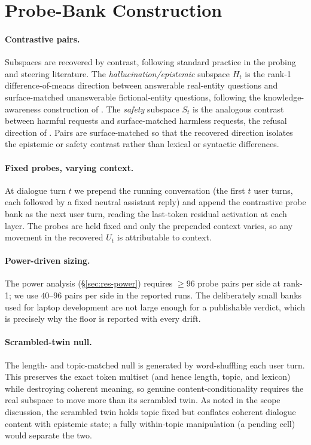 \section{Probe-Bank Construction}
\label{app:probes}

\paragraph{Contrastive pairs.} Subspaces are recovered by contrast, following standard practice
in the probing and steering literature. The \emph{hallucination/epistemic} subspace $H_t$ is the
rank-1 difference-of-means direction between answerable real-entity questions and surface-matched
unanswerable fictional-entity questions, following the knowledge-awareness construction of
\citet{ferrando2025entity}. The \emph{safety} subspace $S_t$ is the analogous contrast between
harmful requests and surface-matched harmless requests, the refusal direction of
\citet{arditi2024refusal}. Pairs are surface-matched so that the recovered direction isolates the
epistemic or safety contrast rather than lexical or syntactic differences.

\paragraph{Fixed probes, varying context.} At dialogue turn $t$ we prepend the running
conversation (the first $t$ user turns, each followed by a fixed neutral assistant reply) and
append the contrastive probe bank as the next user turn, reading the last-token residual
activation at each layer. The probes are held fixed and only the prepended context varies, so any
movement in the recovered $U_t$ is attributable to context.

\paragraph{Power-driven sizing.} The power analysis (\S\ref{sec:res-power}) requires $\geq 96$
probe pairs per side at rank-1; we use $40$--$96$ pairs per side in the reported runs. The
deliberately small banks used for laptop development are not large enough for a publishable
verdict, which is precisely why the floor is reported with every drift.

\paragraph{Scrambled-twin null.} The length- and topic-matched null is generated by
word-shuffling each user turn. This preserves the exact token multiset (and hence length, topic,
and lexicon) while destroying coherent meaning, so genuine content-conditionality requires the
real subspace to move more than its scrambled twin. As noted in the scope discussion, the
scrambled twin holds topic fixed but conflates coherent dialogue content with epistemic state; a
fully within-topic manipulation (a pending cell) would separate the two.

